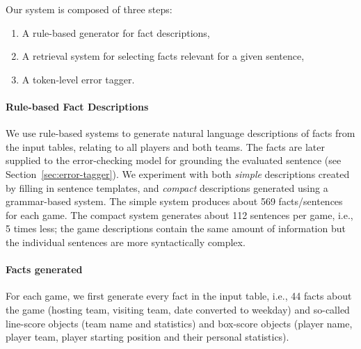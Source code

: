 Our system is composed of three steps:
\begin{enumerate}
    \item A rule-based generator for fact descriptions,
    \item A retrieval system for selecting facts relevant for a given sentence,
    \item A token-level error tagger.
\end{enumerate}


\paragraph{Rule-based Fact Descriptions}

We use rule-based systems to generate natural language descriptions of facts from the input tables, relating to all players and both teams. The facts are later supplied to the error-checking model for grounding the evaluated sentence (see Section~\ref{sec:error-tagger}).
We experiment with both \emph{simple} descriptions created by filling in sentence templates, and \emph{compact} descriptions generated using a grammar-based system.
The simple system produces about 569 facts/sentences for each game.
The compact system generates about 112 sentences per game, i.e., 5 times less; the game descriptions contain the same amount of information but the individual sentences are more syntactically complex.

\paragraph{Facts generated} For each game, we first generate every fact in the input table, i.e., 44 facts about the game (hosting team, visiting team, date converted to weekday) and so-called line-score objects (team name and statistics) and box-score objects (player name, player team, player starting position and their personal statistics).

